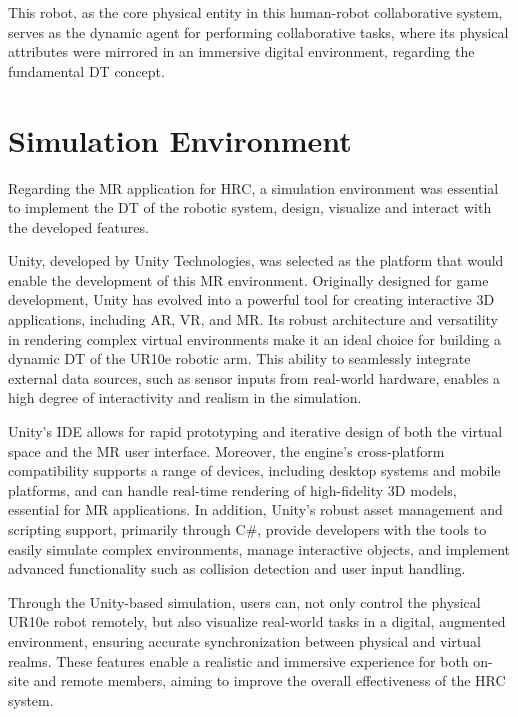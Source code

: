 
This robot, as the core physical entity in this human-robot collaborative system, serves as the dynamic agent for performing collaborative tasks, where its physical attributes were mirrored in an immersive digital environment, regarding the fundamental \ac{DT} concept.

\section{Simulation Environment}

Regarding the \ac{MR} application for \ac{HRC}, a simulation environment was essential to implement the \ac{DT} of the robotic system, design, 
visualize and interact with the developed features.

Unity, developed by Unity Technologies, was selected as the platform that would enable the development of this \ac{MR} environment. Originally designed for game development, Unity has evolved into a powerful tool for creating interactive 3D applications, including \ac{AR}, \ac{VR}, and \ac{MR}. Its robust architecture and versatility in rendering complex virtual environments make it an ideal choice for building a dynamic \ac{DT} of the UR10e robotic arm. This ability to seamlessly integrate external data sources, such as sensor inputs from real-world hardware, enables a high degree of interactivity and realism in the simulation.

Unity’s \ac{IDE} allows for rapid prototyping and iterative design of both the virtual space and the \ac{MR} user interface. Moreover, the engine's cross-platform compatibility supports a range of devices, including desktop systems and mobile platforms, and can handle real-time rendering of high-fidelity 3D models, essential for \ac{MR} applications. In addition, Unity’s robust asset management and scripting support, primarily through C\#, provide developers with the tools to easily simulate complex environments, manage interactive objects, and implement advanced functionality such as collision detection and user input handling.

Through the Unity-based simulation, users can, not only control the physical UR10e robot remotely, but also visualize real-world tasks in a digital, augmented environment, ensuring accurate synchronization between physical and virtual realms. These features enable a realistic and immersive experience for both on-site and remote members, aiming to improve the overall effectiveness of the \ac{HRC} system.

